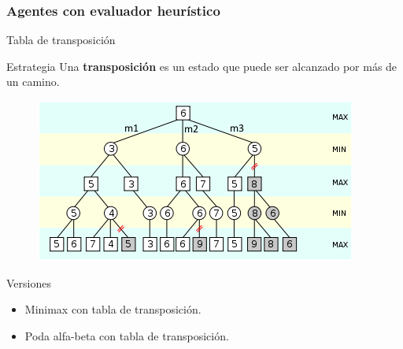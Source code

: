 \documentclass[10pt]{beamer}
\begin{document}
\begin{frame}[squeeze]
\frametitle{Agentes con evaluador heurístico}


{\huge Tabla de transposición}
\begin{block}{Estrategia}
{\footnotesize 
Una \textbf{transposición} es un estado que puede ser alcanzado por más de un camino.
}
\begin{figure}[t]
\centering
\includegraphics[scale=0.5]{imagenes/podaalfabeta.png}
\label{fig:jug_tablaTransposicion}
\end{figure}
\end{block}


{\footnotesize 
\begin{exampleblock}{Versiones}
\begin{itemize}
	\item Minimax con tabla de transposición.
	\item Poda alfa-beta con tabla de transposición.
\end{itemize}
\end{exampleblock}
}

\end{frame}
\end{document}
